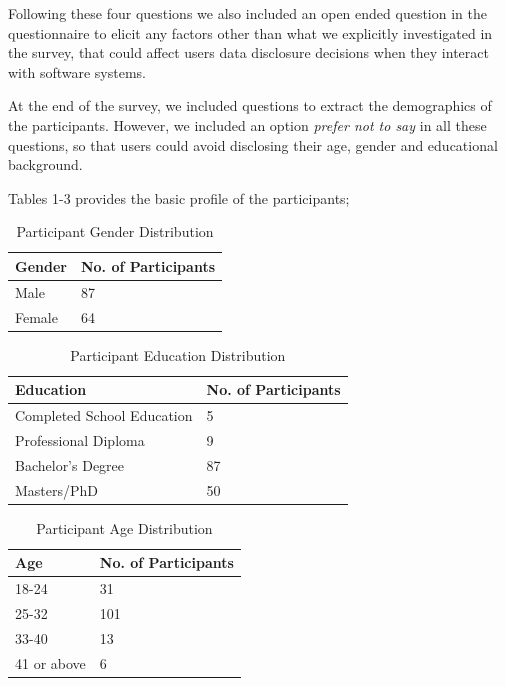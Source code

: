 \documentclass[conference]{IEEEtran}
\begin{document}
Following these four questions we also included an open ended question in the questionnaire to elicit any factors other than what we explicitly investigated in the survey, that could affect users data disclosure decisions when they interact with software systems. 

At the end of the survey, we included questions to extract the demographics of the participants. However, we included an option \textit{prefer not to say} in all these questions, so that users could avoid disclosing their age, gender and educational background.

Tables 1-3 provides the basic profile of the participants;

\begin{center}
\begin{table}[htbp]
\caption{Participant Gender Distribution}
\begin{center}
\begin{tabular}{|l|l|} 
\hline
Gender & No. of Participants \\
\hline
Male & 87 \\
\hline
Female & 64 \\
\hline
\end{tabular}
\end{center}
\end{table}
\end{center} 

\begin{center}
\begin{table}[htbp]
\caption{Participant Education Distribution}
\begin{center}

\begin{tabular}{|l|l|} 
\hline
Education & No. of Participants \\
\hline
Completed School Education & 5 \\
\hline
Professional Diploma & 9 \\
\hline
Bachelor's Degree & 87 \\
\hline
Masters/PhD & 50 \\
\hline
\end{tabular}
\end{center}
\end{table}
\end{center} 

\begin{center}
\begin{table}[htbp]
\caption{Participant Age Distribution}
\begin{center}
\begin{tabular}{|l|l|} 
\hline
Age & No. of Participants \\
\hline
18-24  & 31 \\
\hline
25-32 & 101 \\
\hline
33-40& 13 \\
\hline
41 or above & 6\\
\hline
\end{tabular}
\end{center}
\end{table}
\end{center} 
\end{document}
